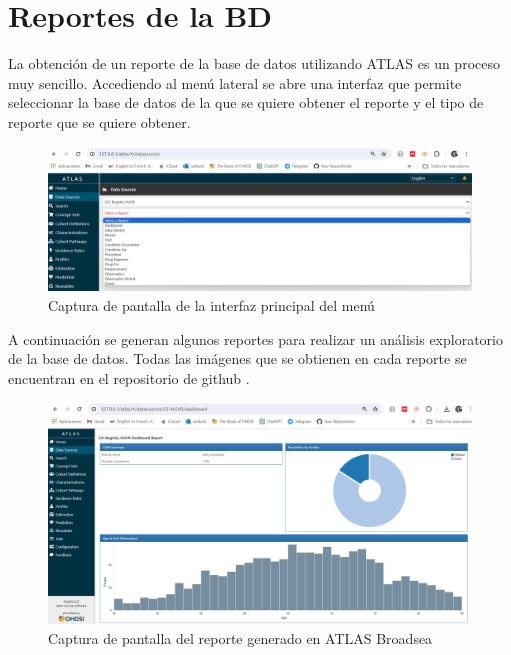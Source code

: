 \chapter{Reportes de la BD} \label{cap:03reporte}

La obtención de un reporte de la base de datos utilizando ATLAS es un proceso muy sencillo. Accediendo al menú lateral  se abre una interfaz que permite seleccionar la base de datos de la que se quiere obtener el reporte y el tipo de reporte que se quiere obtener.

\begin{figure}[H]
    \centering
    \includegraphics[width=1\textwidth]{figures/atlasDataSources.png}
    \caption{Captura de pantalla de la interfaz principal del menú }
    \label{figure:atlasDataSources}
\end{figure}

A continuación se generan algunos reportes para realizar un análisis exploratorio de la base de datos. Todas las imágenes que se obtienen en cada reporte se encuentran en el repositorio de github .

\begin{figure}[H]
    \centering
    \includegraphics[width=1\textwidth]{figures/atlasCAPdashboard.png}
    \caption{Captura de pantalla del reporte  generado en ATLAS Broadsea}
    \label{figure:atlasCAPdashboard}
\end{figure}

